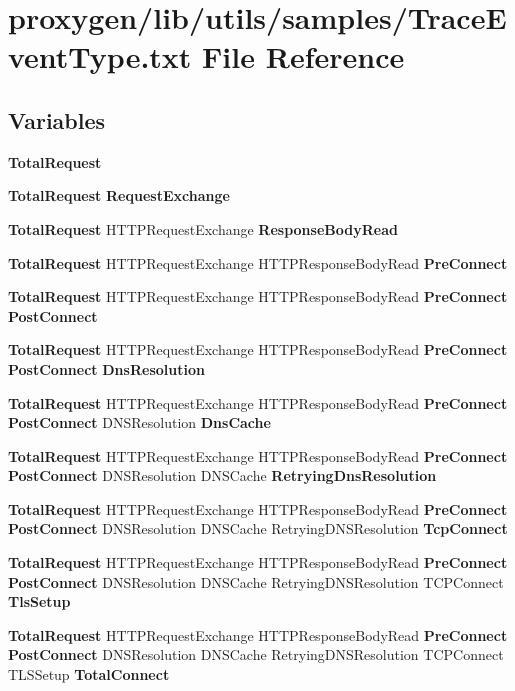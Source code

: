 \section{proxygen/lib/utils/samples/\+Trace\+Event\+Type.txt File Reference}
\label{TraceEventType_8txt}
\subsection*{Variables}
\begin{DoxyCompactItemize}
\item 
{\bf Total\+Request}
\item 
{\bf Total\+Request} {\bf Request\+Exchange}
\item 
{\bf Total\+Request} H\+T\+T\+P\+Request\+Exchange {\bf Response\+Body\+Read}
\item 
{\bf Total\+Request} H\+T\+T\+P\+Request\+Exchange H\+T\+T\+P\+Response\+Body\+Read {\bf Pre\+Connect}
\item 
{\bf Total\+Request} H\+T\+T\+P\+Request\+Exchange H\+T\+T\+P\+Response\+Body\+Read {\bf Pre\+Connect} {\bf Post\+Connect}
\item 
{\bf Total\+Request} H\+T\+T\+P\+Request\+Exchange H\+T\+T\+P\+Response\+Body\+Read {\bf Pre\+Connect} {\bf Post\+Connect} {\bf Dns\+Resolution}
\item 
{\bf Total\+Request} H\+T\+T\+P\+Request\+Exchange H\+T\+T\+P\+Response\+Body\+Read {\bf Pre\+Connect} {\bf Post\+Connect} D\+N\+S\+Resolution {\bf Dns\+Cache}
\item 
{\bf Total\+Request} H\+T\+T\+P\+Request\+Exchange H\+T\+T\+P\+Response\+Body\+Read {\bf Pre\+Connect} {\bf Post\+Connect} D\+N\+S\+Resolution D\+N\+S\+Cache {\bf Retrying\+Dns\+Resolution}
\item 
{\bf Total\+Request} H\+T\+T\+P\+Request\+Exchange H\+T\+T\+P\+Response\+Body\+Read {\bf Pre\+Connect} {\bf Post\+Connect} D\+N\+S\+Resolution D\+N\+S\+Cache Retrying\+D\+N\+S\+Resolution {\bf Tcp\+Connect}
\item 
{\bf Total\+Request} H\+T\+T\+P\+Request\+Exchange H\+T\+T\+P\+Response\+Body\+Read {\bf Pre\+Connect} {\bf Post\+Connect} D\+N\+S\+Resolution D\+N\+S\+Cache Retrying\+D\+N\+S\+Resolution T\+C\+P\+Connect {\bf Tls\+Setup}
\item 
{\bf Total\+Request} H\+T\+T\+P\+Request\+Exchange H\+T\+T\+P\+Response\+Body\+Read {\bf Pre\+Connect} {\bf Post\+Connect} D\+N\+S\+Resolution D\+N\+S\+Cache Retrying\+D\+N\+S\+Resolution T\+C\+P\+Connect T\+L\+S\+Setup {\bf Total\+Connect}

\end{DoxyCompactItemize}
